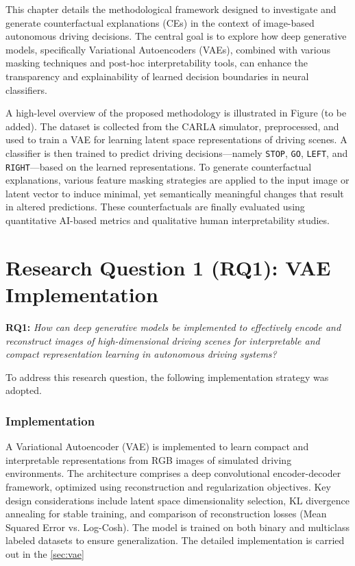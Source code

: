 This chapter details the methodological framework designed to investigate and generate counterfactual explanations (CEs) in the context of image-based autonomous driving decisions. The central goal is to explore how deep generative models, specifically Variational Autoencoders (VAEs), combined with various masking techniques and post-hoc interpretability tools, can enhance the transparency and explainability of learned decision boundaries in neural classifiers.


A high-level overview of the proposed methodology is illustrated in Figure (to be added). The dataset is collected from the CARLA simulator, preprocessed, and used to train a VAE for learning latent space representations of driving scenes. A classifier is then trained to predict driving decisions—namely \texttt{STOP}, \texttt{GO}, \texttt{LEFT}, and \texttt{RIGHT}—based on the learned representations. To generate counterfactual explanations, various feature masking strategies are applied to the input image or latent vector to induce minimal, yet semantically meaningful changes that result in altered predictions. These counterfactuals are finally evaluated using quantitative AI-based metrics and qualitative human interpretability studies.

\section*{Research Question 1 (RQ1): VAE Implementation}

\textbf{RQ1:} \textit{How can deep generative models be implemented to effectively encode and reconstruct images of high-dimensional driving scenes for interpretable and compact representation learning in autonomous driving systems?}

To address this research question, the following implementation strategy was adopted.

\subsubsection*{Implementation}
    A Variational Autoencoder (VAE) is implemented to learn compact and interpretable representations from RGB images of simulated driving environments. The architecture comprises a deep convolutional encoder-decoder framework, optimized using reconstruction and regularization objectives. Key design considerations include latent space dimensionality selection, KL divergence annealing for stable training, and comparison of reconstruction losses (Mean Squared Error vs. Log-Cosh). The model is trained on both binary and multiclass labeled datasets to ensure generalization. The detailed implementation is carried out in the \cref{sec:vae}



